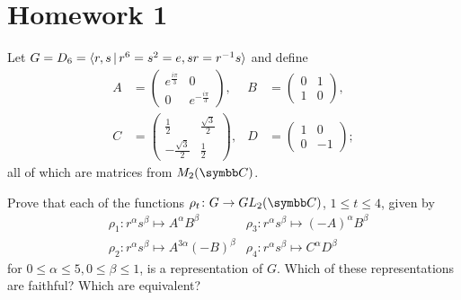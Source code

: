 \section*{Homework 1}

\begin{exercise}
Let \(G = D_6 = \braket{r, s \, | \, r^6 = s^2 = e, sr = r^{-1}s}\) and define
\begin{align*}
    A &= \begin{pmatrix}
        e^{\frac{i \pi}{3}} & 0 \\
        0 & e^{-\frac{i \pi}{3}}
    \end{pmatrix},
    &B &= \begin{pmatrix}
        0 & 1 \\
        1 & 0
    \end{pmatrix}, \\[0.5em]
    C &= \begin{pmatrix}
        \frac{1}{2} & \frac{\sqrt{3}}{2} \\
        -\frac{\sqrt{3}}{2} & \frac{1}{2} 
    \end{pmatrix},
    &D &= \begin{pmatrix}
        1 & 0 \\
        0 & -1
    \end{pmatrix};
\end{align*}
all of which are matrices from \(M_2(\complex)\).

Prove that each of the functions \(\rho_t \colon G \to GL_2(\complex)\), \(1 \leq t \leq 4\), given by
\begin{align*}
    &\rho_1 \colon r^\alpha s^\beta \mapsto A^\alpha B^\beta
    &\rho_3 \colon r^\alpha s^\beta \mapsto (-A)^\alpha B^\beta \\
    &\rho_2 \colon r^\alpha s^\beta \mapsto A^{3\alpha} (-B)^\beta
    & \rho_4 \colon r^\alpha s^\beta \mapsto C^\alpha D^\beta
\end{align*}
for \(0 \leq \alpha \leq 5, 0 \leq \beta \leq 1\), is a representation of \(G\). Which of these representations are faithful? Which are equivalent?
\end{exercise}
